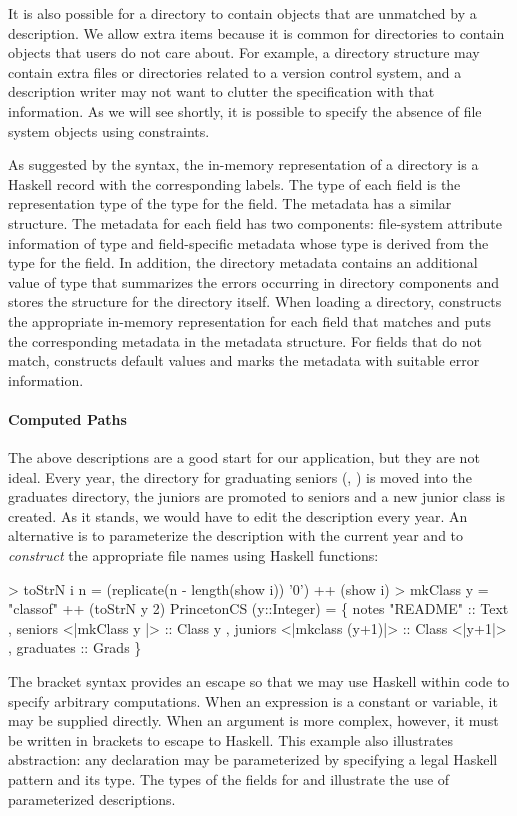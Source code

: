 It is also possible for a directory to contain objects
that are unmatched by a description.  We allow extra items because it
is common for directories to contain objects that users do not care
about.  For example, a directory structure may contain extra files or
directories related to a version control system, and a
description writer may not want to clutter the \forest{} specification
with that information.  As we will see shortly, it is possible to
specify the absence of file system objects using constraints.

As suggested by the syntax, the in-memory representation of a
directory is a Haskell record with the corresponding labels.  The type
of each field is the representation type of the \forest{} type for the
field. The metadata has a similar structure. The metadata for
each field has two components: file-system attribute information of
type  and field-specific metadata whose type is derived
from the \forest{} type for the field.  In addition, the directory
metadata contains an additional value of type  that 
summarizes the errors occurring in directory components and stores the
 structure for 
the directory itself.
When loading a directory, \forest{} constructs the appropriate in-memory
representation for each field that matches and puts the corresponding
metadata in the metadata structure. For fields that do not 
match, \forest{} constructs default values and marks the metadata with
suitable error information.


\paragraph*{Computed Paths}
\label{sec:computed-paths}

The above descriptions are a good start for our application, but they are
not ideal.  Every year, the directory for graduating seniors 
(\ie{}, ) is moved into the graduates directory,
the juniors are promoted to seniors and a new junior class is created.
As it stands, we would have to edit the description every year.
An alternative is to parameterize the description with the current year and
to \textit{construct} the appropriate file names using Haskell functions:
\begin{code}
> toStrN i n = (replicate(n - length(show i)) '0') 
               ++ (show i)
> mkClass y = "classof" ++ (toStrN y 2)
\mbox{}
 PrincetonCS (y::Integer) = 
  \{ notes    "README" :: Text
  , seniors  <|mkClass y    |> :: Class y
  , juniors  <|mkclass (y+1)|> :: Class <|y+1|>
  , graduates :: Grads \}
\end{code}
The bracket syntax  provides an escape so that we may use
Haskell within \forest{} code to specify arbitrary computations.  
When an expression is a constant or variable,
it may be supplied directly.  When an argument is more complex,
however, it must be written in brackets to escape to Haskell.
This example also
illustrates abstraction: any \forest{} declaration may be
parameterized by specifying a legal Haskell pattern and
its type.  The types of the fields for  and 
illustrate the use of parameterized descriptions.


